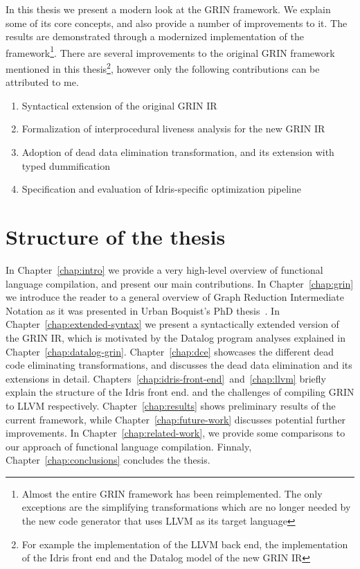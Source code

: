 \documentclass[main.tex]{subfiles}
\begin{document}
	In this thesis we present a modern look at the GRIN framework. We explain some of its core concepts, and also provide a number of improvements to it. The results are demonstrated through a modernized implementation of the framework\footnote{Almost the entire GRIN framework has been reimplemented. The only exceptions are the simplifying transformations which are no longer needed by the new code generator that uses LLVM as its target language}. There are several improvements to the original GRIN framework mentioned in this thesis\footnote{For example the implementation of the LLVM back end, the implementation of the Idris front end and the Datalog model of the new GRIN IR}, however only the following contributions can be attributed to me.
	
	\hspace{0.5cm}
	\begin{enumerate}
		\item Syntactical extension of the original GRIN IR
		
		\item Formalization of interprocedural liveness analysis for the new GRIN IR 
		
		\item Adoption of dead data elimination transformation, and its extension with typed dummification
		
		\item Specification and evaluation of Idris-specific optimization pipeline
	\end{enumerate}

	\section{Structure of the thesis}
	
	In Chapter~\ref{chap:intro} we provide a very high-level overview of functional language compilation, and present our main contributions. In Chapter~\ref{chap:grin} we introduce the reader to a general overview of Graph Reduction Intermediate Notation as it was presented in Urban Boquist's PhD thesis~\cite{boquist-phd}. In Chapter~\ref{chap:extended-syntax} we present a syntactically extended version of the GRIN IR, which is motivated by the Datalog program analyses explained in Chapter~\ref{chap:datalog-grin}. Chapter~\ref{chap:dce} showcases the different dead code eliminating transformations, and discusses the dead data elimination and its extensions in detail. Chapters~\ref{chap:idris-front-end}~and~\ref{chap:llvm} briefly explain the structure of the Idris front end. and the challenges of compiling GRIN to LLVM respectively. Chapter~\ref{chap:results} shows preliminary results of the current framework, while Chapter~\ref{chap:future-work} discusses potential further improvements. In Chapter~\ref{chap:related-work}, we provide some comparisons to our approach of functional language compilation. Finnaly, Chapter~\ref{chap:conclusions} concludes the thesis.
	
\end{document}
